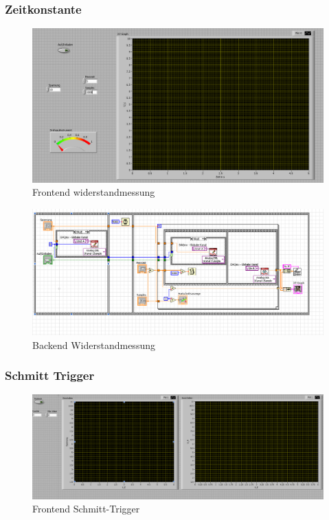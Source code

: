 \documentclass[12pt,twoside,a4paper]{scrartcl}
\begin{document}
		\subsubsection{Zeitkonstante}
			\label{Programme::Kondensator}

			\begin{figure}[H]
				\centering
				\includegraphics[width =  \textwidth]{Pictures/Programme/Frontend_Capacitor}
				\caption{Frontend widerstandmessung}
			\end{figure}

				\begin{figure}[H]
					\centering
					\includegraphics[width =  \textwidth]{Pictures/Programme/Backend_Capacitor}
					\caption{Backend Widerstandmessung}
				\end{figure}

		\subsubsection{Schmitt Trigger}
			\label{Programme::Schmitt}
			\begin{figure}[H]
				\centering
				\includegraphics[width = \textwidth]{Pictures/Programme/Frontend_Schmitt}
				\caption{Frontend Schmitt-Trigger}
			\end{figure}
\end{document}
